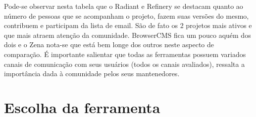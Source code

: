 Pode-se observar nesta tabela que o Radiant e Refinery se destacam quanto ao número de pessoas que se acompanham o projeto, fazem suas versões do mesmo, contribuem e participam da lista de email. São de fato os 2 projetos mais ativos e que mais atraem atenção da comunidade. BrowserCMS fica um pouco aquém dos dois e o Zena nota-se que está bem longe dos outros neste aspecto de comparação. É importante salientar que todas as ferramentas possuem variados canais de comunicação com seus usuários (todos os canais avaliados), ressalta a importância dada à comunidade pelos seus mantenedores.

\section{Escolha da ferramenta}

